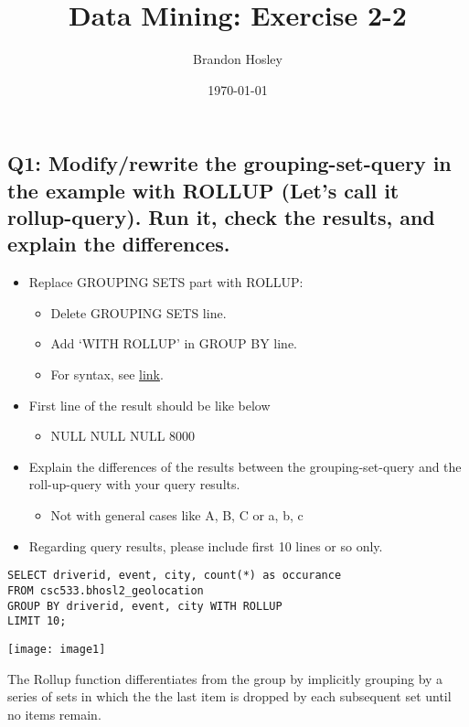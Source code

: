\documentclass[]{article}
\title{Data Mining: Exercise 2-2}
\author{Brandon Hosley}
\date{\today}
\begin{document}
\maketitle


\subsection*{Q1: Modify/rewrite the grouping-set-query in the example with ROLLUP (Let’s call it rollup-query). Run it, check the results, and explain the differences.}

\begin{itemize}[before=\itshape,font=\normalfont]
	\item Replace GROUPING SETS part with ROLLUP:
	\begin{itemize}
		\item Delete GROUPING SETS line.
		\item Add ‘WITH ROLLUP’ in GROUP BY line.
		\item For syntax, see \href{https://cwiki.apache.org/confluence/display/Hive/Enhanced+Aggregation\%2C+Cube\%2C+Grouping+and+Rollup}{link}.
	\end{itemize}
	\item First line of the result should be like below
	\begin{itemize}
		\item NULL NULL NULL 8000
	\end{itemize}
	\item Explain the differences of the results between the grouping-set-query and the roll-up-query with your query results. 
	\begin{itemize}
		\item Not with general cases like A, B, C or a, b, c 
	\end{itemize}
	\item Regarding query results, please include first 10 lines or so only.
\end{itemize}

\begin{verbatim}
SELECT driverid, event, city, count(*) as occurance
FROM csc533.bhosl2_geolocation
GROUP BY driverid, event, city WITH ROLLUP
LIMIT 10;
\end{verbatim}

\texttt{[image: image1]}

The Rollup function differentiates from the group by implicitly grouping by a series of sets in which the the last item is dropped by each subsequent set until no items remain.
\end{document}
